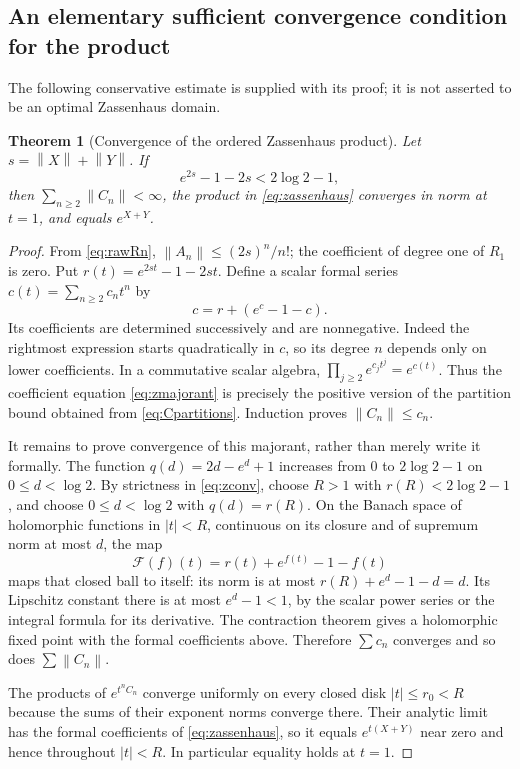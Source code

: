 \documentclass[11pt]{article}
\newtheorem{theorem}{Theorem}[section]
\theoremstyle{definition}
\theoremstyle{remark}
\newcommand{\norm}[1]{\left\lVert #1\right\rVert}
\numberwithin{equation}{section}
\begin{document}
\subsection{An elementary sufficient convergence condition for the product}
The following conservative estimate is supplied with its proof; it is not asserted to be an optimal Zassenhaus domain.
\begin{theorem}[Convergence of the ordered Zassenhaus product]\label{thm:zconv}
Let $s=\norm X+\norm Y$. If
\begin{equation}\label{eq:zconv}
 e^{2s}-1-2s<2\log2-1,
\end{equation}
then $\sum_{n\geq2}\norm{C_n}<\infty$, the product in \eqref{eq:zassenhaus} converges in norm at $t=1$, and equals $e^{X+Y}$.
\end{theorem}
\begin{proof}
From \eqref{eq:rawRn}, $\norm{A_n}\leq(2s)^n/n!$; the coefficient of degree one of $R_1$ is zero. Put
$r(t)=e^{2st}-1-2st$. Define a scalar formal series $c(t)=\sum_{n\geq2}c_nt^n$ by
\begin{equation}\label{eq:zmajorant}
 c=r+(e^c-1-c).
\end{equation}
Its coefficients are determined successively and are nonnegative. Indeed the rightmost expression starts quadratically in $c$, so its degree $n$ depends only on lower coefficients. In a commutative scalar algebra,
$\prod_{j\geq2}e^{c_jt^j}=e^{c(t)}$.
Thus the coefficient equation \eqref{eq:zmajorant} is precisely the positive version of the partition bound obtained from \eqref{eq:Cpartitions}. Induction proves $\norm{C_n}\leq c_n$.

It remains to prove convergence of this majorant, rather than merely write it formally. The function $q(d)=2d-e^d+1$ increases from $0$ to $2\log2-1$ on $0\leq d<\log2$. By strictness in \eqref{eq:zconv}, choose $R>1$ with $r(R)<2\log2-1$, and choose $0\leq d<\log2$ with $q(d)=r(R)$. On the Banach space of holomorphic functions in $|t|<R$, continuous on its closure and of supremum norm at most $d$, the map
\[
 \mathcal F(f)(t)=r(t)+e^{f(t)}-1-f(t)
\]
maps that closed ball to itself: its norm is at most
$r(R)+e^d-1-d=d$. Its Lipschitz constant there is at most $e^d-1<1$, by the scalar power series or the integral formula for its derivative. The contraction theorem gives a holomorphic fixed point with the formal coefficients above. Therefore $\sum c_n$ converges and so does $\sum\norm{C_n}$.

The products of $e^{t^nC_n}$ converge uniformly on every closed disk $|t|\leq r_0<R$ because the sums of their exponent norms converge there. Their analytic limit has the formal coefficients of \eqref{eq:zassenhaus}, so it equals $e^{t(X+Y)}$ near zero and hence throughout $|t|<R$. In particular equality holds at $t=1$.
\end{proof}
\end{document}
